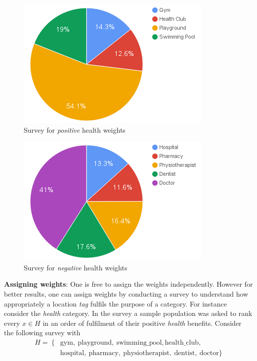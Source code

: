\documentclass[conference]{IEEEtran}
\begin{document}
\begin{figure}[h!]
\centering
\captionsetup{justification=centering}
\noindent \includegraphics[scale=0.5]{fig2}
\caption{Survey for \textit{positive} health weights}
\end{figure}
\begin{figure}[h!]
\centering
\captionsetup{justification=centering}
\noindent \includegraphics[scale=0.5]{fig3}
\caption{Survey for \textit{negative} health weights}
\end{figure}
\textbf{Assigning weights}: One is free to assign the weights independently. However for better results, one can assign weights by conducting a survey to understand how appropriately a location \textit{tag} fulfils the purpose of a category. For instance consider the \textit{health} category. In the survey a sample population was asked to rank every $x \in H$ in an order of fulfilment of their positive \textit{health} benefits. Consider the following survey with 
\begin{align*}
H =\ \{&\text{gym},\ \text{playground},\ \text{swimming\_pool}, \text{health\_club},\\
&\text{hospital},\ \text{pharmacy},\ \text{physiotherapist},\ \text{dentist},\ \text{doctor}\}
\end{align*}
\end{document}
